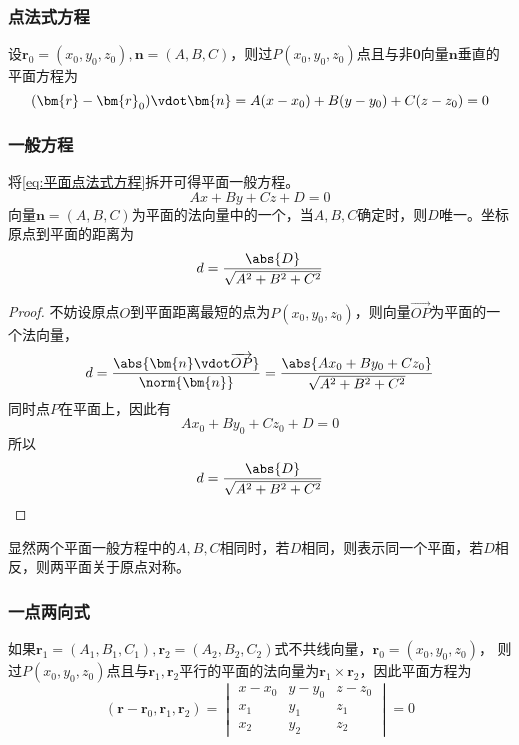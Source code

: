\subsubsection{点法式方程}
设$\bm{r}_0=(x_0,y_0,z_0),\bm{n}=(A,B,C)$，则过$P(x_0,y_0,z_0)$点且与非$\bm{0}$向量$\bm{n}$垂直的平面方程为
\begin{equation}
    \label{eq:平面点法式方程}
    (\bm{r}-\bm{r}_0)\vdot \bm{n} = A(x-x_0) + B(y-y_0) + C(z-z_0) = 0
\end{equation}

\subsubsection{一般方程}
将\ref{eq:平面点法式方程}拆开可得平面一般方程。
\begin{equation}
    \label{eq:平面一般方程}
    Ax + By + Cz + D = 0
\end{equation}
向量$\bm{n}=(A,B,C)$为平面的法向量中的一个，当$A,B,C$确定时，则$D$唯一。坐标原点到平面的距离为
\begin{equation}
    d = \frac{\abs{D}}{\sqrt{A^2+B^2+C^2}}
\end{equation}
\begin{proof}
    不妨设原点$O$到平面距离最短的点为$P(x_0,y_0,z_0)$，则向量$\overrightarrow{OP}$为平面的一个法向量，
    \[
        d
        = \frac{\abs{\bm{n}\vdot\overrightarrow{OP}}}{\norm{\bm{n}}}
        = \frac{\abs{Ax_0 + By_0 + Cz_0}}{\sqrt{A^2+B^2+C^2}}
    \]
    同时点$P$在平面上，因此有
    \[ Ax_0 + By_0 + Cz_0 + D = 0 \]
    所以
    \[ d= \frac{\abs{D}}{\sqrt{A^2+B^2+C^2}} \]
\end{proof}
显然两个平面一般方程中的$A,B,C$相同时，若$D$相同，则表示同一个平面，若$D$相反，则两平面关于原点对称。

\subsubsection{一点两向式}
如果$\bm{r}_1=(A_1,B_1,C_1),\bm{r}_2=(A_2,B_2,C_2)$式不共线向量，$\bm{r}_0=(x_0,y_0,z_0)$，
则过$P(x_0,y_0,z_0)$点且与$\bm{r}_1,\bm{r}_2$平行的平面的法向量为$\bm{r}_1\times\bm{r}_2$，因此平面方程为
\begin{equation}
    \label{eq:平面一点两向式}
    (\bm{r}-\bm{r}_0,\bm{r}_1,\bm{r}_2)=
    \begin{vmatrix}
        x-x_0 & y-y_0 & z-z_0 \\
        x_1   & y_1   & z_1   \\
        x_2   & y_2   & z_2
    \end{vmatrix}
    =0
\end{equation}


